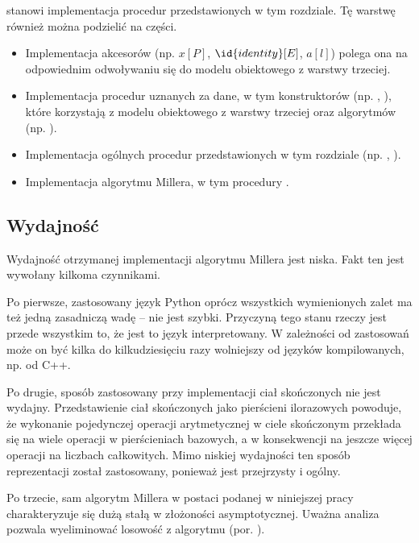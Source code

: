 \begin{enumerate}
stanowi implementacja procedur przedstawionych w tym rozdziale.
Tę warstwę również można podzielić na części.
\begin{itemize}
\item
Implementacja akcesorów (np. $x[P]$, $\id{identity}[E]$, $a[l]$)
polega ona na odpowiednim odwoływaniu się
do modelu obiektowego z warstwy trzeciej.
\item
Implementacja procedur uznanych za dane,
w tym konstruktorów
(np. ,
),
które korzystają z modelu obiektowego z warstwy trzeciej
oraz algorytmów
(np. ).
\item
Implementacja ogólnych procedur przedstawionych w tym rozdziale
(np. ,
).
\item
Implementacja algorytmu Millera,
w tym procedury .
\end{itemize}
\end{enumerate}

\subsection*{Wydajność}

\noindent
Wydajność otrzymanej implementacji algorytmu Millera jest niska.
Fakt ten jest wywołany kilkoma czynnikami.

\noindent
Po pierwsze, zastosowany język Python oprócz wszystkich wymienionych zalet
ma też jedną zasadniczą wadę -- nie jest szybki.
Przyczyną tego stanu rzeczy jest przede wszystkim to,
że jest to język interpretowany.
W zależności od zastosowań może on być kilka do kilkudziesięciu razy
wolniejszy od języków kompilowanych, np. od C++.

\noindent
Po drugie, sposób zastosowany przy implementacji ciał skończonych
nie jest wydajny.
Przedstawienie ciał skończonych jako pierścieni ilorazowych powoduje,
że wykonanie pojedynczej operacji arytmetycznej w ciele skończonym
przekłada się na wiele operacji w pierścieniach bazowych,
a w konsekwencji na jeszcze więcej operacji na liczbach całkowitych.
Mimo niskiej wydajności ten sposób reprezentacji został zastosowany,
ponieważ jest przejrzysty i ogólny.

\noindent
Po trzecie, sam algorytm Millera w postaci podanej w niniejszej pracy
charakteryzuje się dużą stałą w złożoności asymptotycznej.
Uważna analiza pozwala wyeliminować losowość z algorytmu (por. \cite{miller}).

